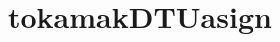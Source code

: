 \appendix
\appendixpage
\addappheadtotoc
\section{tokamakDTU\textunderscore asign}
\inputminted[bgcolor=Black,linenos=true]{python}{Listings/tokamakDTU_asign_1.m}
